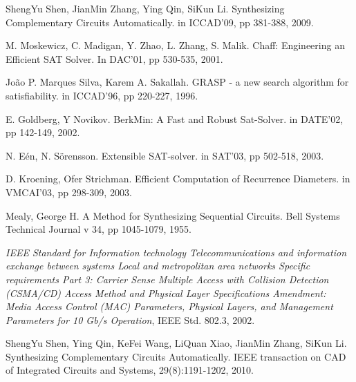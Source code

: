 \documentclass[journal]{IEEEtran}
\begin{document}
%
%
%
\begin{thebibliography}{1}

ShengYu Shen, JianMin Zhang, Ying Qin, SiKun Li.
Synthesizing Complementary Circuits Automatically.
in ICCAD'09,
pp 381-388,
2009.

M. Moskewicz, C. Madigan, Y. Zhao, L. Zhang, S. Malik.
Chaff: Engineering an Efficient SAT Solver.
In DAC'01,
pp 530-535,
2001.

Jo\~ao P. Marques Silva, Karem A. Sakallah.
GRASP - a new search algorithm for satisfiability.
in ICCAD'96,
pp 220-227,
1996.

E. Goldberg, Y Novikov.
BerkMin: A Fast and Robust Sat-Solver.
in DATE'02,
pp 142-149,
2002.

N. E\'en, N. S\"orensson.
Extensible SAT-solver.
in SAT'03,
pp 502-518,
2003.

D. Kroening, Ofer Strichman.
Efficient Computation of Recurrence Diameters.
in VMCAI'03,
pp 298-309,
2003.

Mealy, George H.
A Method for Synthesizing Sequential Circuits.
Bell Systems Technical Journal v 34, pp 1045-1079, 1955.

\emph{IEEE Standard for Information technology Telecommunications and
  information exchange between systems Local and metropolitan area networks
  Specific requirements Part 3: Carrier Sense Multiple Access with Collision
  Detection (CSMA/CD) Access Method and Physical Layer Specifications
  Amendment: Media Access Control (MAC) Parameters, Physical Layers, and
  Management Parameters for 10 Gb/s Operation}, IEEE Std. 802.3, 2002.

ShengYu Shen, Ying Qin, KeFei Wang, LiQuan Xiao, JianMin Zhang, SiKun Li.
Synthesizing Complementary Circuits Automatically.
IEEE transaction on CAD of Integrated Circuits and Systems,
29(8):1191-1202,
2010.


\end{thebibliography}
\end{document}
